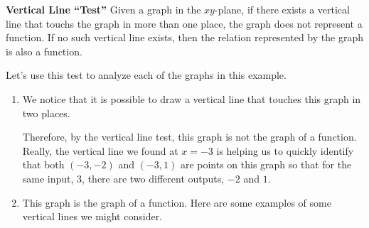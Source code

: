 \documentclass{ximera}
\begin{document}
\begin{example}
\begin{explanation}
\begin{callout}\textbf{Vertical Line ``Test''}  
Given a graph in the $xy$-plane, if there exists a vertical line that touchs the graph in more than one place, the graph does not represent a function.  If no such vertical line exists, then the relation represented by the graph is also a function.
\end{callout}

Let's use this test to analyze each of the graphs in this example.
\begin{enumerate}[label=\alph*.]
\item  We notice that it is possible to draw a vertical line that touches this graph in two places.

\begin{image}
\end{image}

Therefore, by the vertical line test, this graph is not the graph of a function.  Really, the vertical line we found at $x=-3$ is helping us to quickly identify that both $(-3,-2)$ and $(-3, 1)$ are points on this graph so that for the same input, $3$, there are two different outputs, $-2$ and $1$. 

\item This graph is the graph of a function.  Here are some examples of some vertical lines we might consider.

 \begin{image}
 \end{image}
 

\end{enumerate}
\end{explanation}
\end{example}
\end{document}
